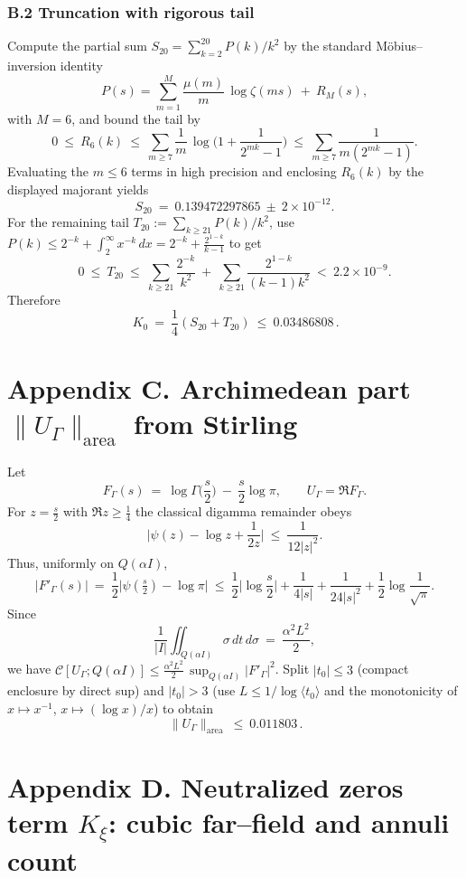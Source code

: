 \documentclass[11pt]{article}
\theoremstyle{definition}
\theoremstyle{remark}
\begin{document}
\subsubsection*{B.2 Truncation with rigorous tail}
Compute the partial sum $S_{20}=\sum_{k=2}^{20} P(k)/k^2$ by the standard Möbius–inversion identity
\[
P(s)=\sum_{m=1}^{M}\frac{\mu(m)}{m}\,\log\zeta(ms)\ +\ R_{M}(s),
\]
with $M=6$, and bound the tail by
\[
0\ \le\ R_{6}(k)\ \le\ \sum_{m\ge7}\frac{1}{m}\,\log\!\Big(1+\frac{1}{2^{mk}-1}\Big)\ \le\ \sum_{m\ge7}\frac{1}{m(2^{mk}-1)}.
\]
Evaluating the $m\le6$ terms in high precision and enclosing $R_{6}(k)$ by the displayed majorant yields
\[
S_{20}\ =\ 0.139472297865\ \pm\ 2\times 10^{-12}.
\]
For the remaining tail $T_{20}:=\sum_{k\ge21} P(k)/k^2$, use $P(k)\le 2^{-k}+\int_{2}^{\infty}x^{-k}\,dx=2^{-k}+\frac{2^{1-k}}{k-1}$ to get
\[
0\ \le\ T_{20}\ \le\ \sum_{k\ge21}\frac{2^{-k}}{k^2} \ +\ \sum_{k\ge21}\frac{2^{1-k}}{(k-1)k^2}\ <\ 2.2\times 10^{-9}.
\]
Therefore
\[
\boxed{\,K_0\ =\ \frac14(S_{20}+T_{20})\ \le\ 0.03486808\,}.
\]

\section*{Appendix C. Archimedean part $\|U_\Gamma\|_{\mathrm{area}}$ from Stirling}

Let
\[
F_\Gamma(s)\ =\ \log\Gamma\!\Big(\frac{s}{2}\Big)\ -\ \frac{s}{2}\log\pi,\qquad U_\Gamma=\Re F_\Gamma.
\]
For $z=\frac{s}{2}$ with $\Re z\ge\tfrac14$ the classical digamma remainder obeys
\[
\Big|\psi(z)-\log z+\frac{1}{2z}\Big|\ \le\ \frac{1}{12|z|^2}.
\]
Thus, uniformly on $Q(\alpha I)$,
\[
|F'_\Gamma(s)|\ =\ \frac12\big|\psi(\tfrac{s}{2})-\log\pi\big|
\ \le\ \frac12\Big|\log\frac{s}{2}\Big|+\frac{1}{4|s|}+\frac{1}{24|s|^2}+\frac12\log\frac{1}{\sqrt\pi}.
\]
Since
\[
\frac{1}{|I|}\iint_{Q(\alpha I)}\sigma\,dt\,d\sigma\ =\ \frac{\alpha^2 L^2}{2},
\]
we have $\mathcal C[U_\Gamma;Q(\alpha I)]\le \frac{\alpha^2L^2}{2}\,\sup_{Q(\alpha I)} |F'_\Gamma|^2$. Split $|t_0|\le3$ (compact enclosure by direct sup) and $|t_0|>3$ (use $L\le1/\log\langle t_0\rangle$ and the monotonicity of $x\mapsto x^{-1}$, $x\mapsto(\log x)/x$) to obtain
\[
\boxed{\,\|U_\Gamma\|_{\mathrm{area}}\ \le\ 0.011803\,}.
\]

\section*{Appendix D. Neutralized zeros term $K_\xi$: cubic far–field and annuli count}
\end{document}

